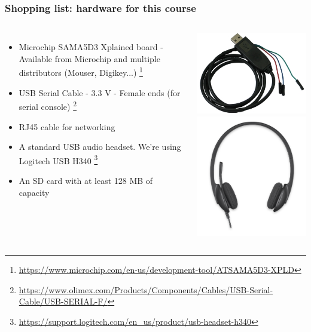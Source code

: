 \begin{frame}
\frametitle{Shopping list: hardware for this course}
  \begin{columns}
    \footnotesize
    \begin{itemize}
      \item Microchip SAMA5D3 Xplained board - Available from Microchip and
	    multiple distributors (Mouser, Digikey...)
	    \footnote{\tiny \url{https://www.microchip.com/en-us/development-tool/ATSAMA5D3-XPLD}}
      \item USB Serial Cable - 3.3 V - Female ends (for serial console)
            \footnote{\tiny \url{https://www.olimex.com/Products/Components/Cables/USB-Serial-Cable/USB-SERIAL-F/}}
      \item RJ45 cable for networking
      \item A standard USB audio headset. We're using Logitech USB H340
            \footnote{\tiny \url{https://support.logitech.com/en_us/product/usb-headset-h340}}
      \item An SD card with at least 128 MB of capacity
    \end{itemize}
    \includegraphics[height=0.20\textheight]{common/usb-serial-cable-female.png} \\
    \vspace{1cm}
    \includegraphics[height=0.15\textheight]{common/logitech-h340.png} \\

\end{columns}
\end{frame}
